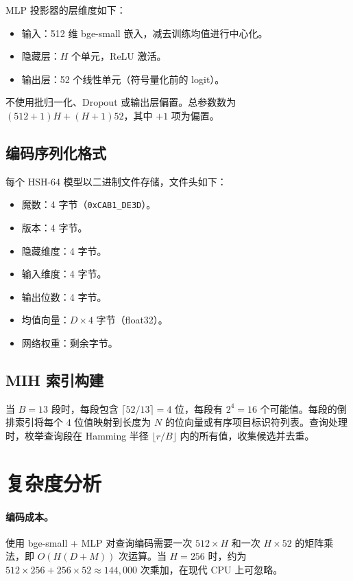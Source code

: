 \documentclass[11pt,a4paper]{article}
\begin{document}
MLP 投影器的层维度如下：
\begin{itemize}[leftmargin=*]
    \item 输入：512 维 bge-small 嵌入，减去训练均值进行中心化。
    \item 隐藏层：$H$ 个单元，ReLU 激活。
    \item 输出层：52 个线性单元（符号量化前的 logit）。
\end{itemize}
不使用批归一化、Dropout 或输出层偏置。总参数数为 $(512+1)H + (H+1)52$，其中 $+1$ 项为偏置。

\subsection{编码序列化格式}

每个 HSH-64 模型以二进制文件存储，文件头如下：
\begin{itemize}[leftmargin=*]
    \item 魔数：4 字节（\texttt{0xCAB1\_DE3D}）。
    \item 版本：4 字节。
    \item 隐藏维度：4 字节。
    \item 输入维度：4 字节。
    \item 输出位数：4 字节。
    \item 均值向量：$D \times 4$ 字节（float32）。
    \item 网络权重：剩余字节。
\end{itemize}

\subsection{MIH 索引构建}

当 $B=13$ 段时，每段包含 $\lceil 52/13 \rceil = 4$ 位，每段有 $2^4=16$ 个可能值。每段的倒排索引将每个 4 位值映射到长度为 $N$ 的位向量或有序项目标识符列表。查询处理时，枚举查询段在 Hamming 半径 $\lfloor r/B \rfloor$ 内的所有值，收集候选并去重。

\section{复杂度分析}

\paragraph{编码成本。} 使用 bge-small + MLP 对查询编码需要一次 $512 \times H$ 和一次 $H \times 52$ 的矩阵乘法，即 $O(H(D+M))$ 次运算。当 $H=256$ 时，约为 $512 \times 256 + 256 \times 52 \approx 144{,}000$ 次乘加，在现代 CPU 上可忽略。
\end{document}
